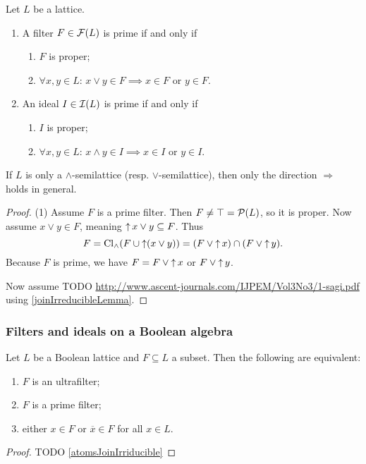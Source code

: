 \begin{proposition}
Let $L$ be a lattice.
\begin{enumerate}
\item A filter $F\in \operatorname{\mathcal{F}}(L)$ is prime \textup{if and only if}
\begin{enumerate}
\item $F$ is proper;
\item $\forall x,y\in L$: $x\vee y \in F \implies x\in F$ or $y\in F$.
\end{enumerate}
\item An ideal $I\in \operatorname{\mathcal{I}}(L)$ is prime \textup{if and only if}
\begin{enumerate}
\item $I$ is proper;
\item $\forall x,y\in L$: $x\wedge y \in I \implies x\in I$ or $y\in I$.
\end{enumerate}
\end{enumerate}
\end{proposition}
If $L$ is only a $\wedge$-semilattice (resp. $\vee$-semilattice), then only the direction $\Rightarrow$ holds in general.
\begin{proof}
(1) Assume $F$ is a prime filter. Then $F \neq \top = \operatorname{\mathcal{P}}(L)$, so it is proper. Now assume $x\vee y\in F$, meaning $\operatorname{\uparrow} x\vee y \subseteq F$. Thus
\[ F = \operatorname{Cl}_\wedge (F\cup \operatorname{\uparrow}(x\vee y)) = (F\vee \operatorname{\uparrow} x) \cap (F\vee \operatorname{\uparrow} y). \]
Because $F$ is prime, we have $F = F\vee \operatorname{\uparrow} x$ or $F\vee \operatorname{\uparrow} y$.

Now assume TODO \url{http://www.ascent-journals.com/IJPEM/Vol3No3/1-sagi.pdf} using \ref{joinIrreducibleLemma}.
\end{proof}

\subsubsection{Filters and ideals on a Boolean algebra}

\begin{proposition} \label{booleanMaximalFiltersIdeals}
Let $L$ be a Boolean lattice and $F\subseteq L$ a subset. Then the following are equivalent:
\begin{enumerate}
\item $F$ is an ultrafilter;
\item $F$ is a prime filter;
\item either $x\in F$ or $\overline{x}\in F$ for all $x\in L$.
\end{enumerate}
\end{proposition}
\begin{proof}
TODO \ref{atomsJoinIrriducible}
\end{proof}

